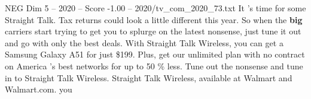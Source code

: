 \begin{textsample}{NEG Dim 5 – 2020 – Score -1.00 – 2020/tv\_com\_2020\_73.txt}  \label{ex:f5_neg_068}
It 's time for some Straight Talk.
Tax returns could look a little different this year.
So when the \textbf{big} carriers start trying to get you to splurge on the latest nonsense, just tune it out and go with only the best deals.
With Straight Talk Wireless, you can get a Samsung Galaxy A51 for just \$199.
Plus, get our unlimited plan with no contract on America 's best networks for up to 50 \% less.
Tune out the nonsense and tune in to Straight Talk Wireless.
Straight Talk Wireless, available at Walmart and Walmart.com. you

\end{textsample}
